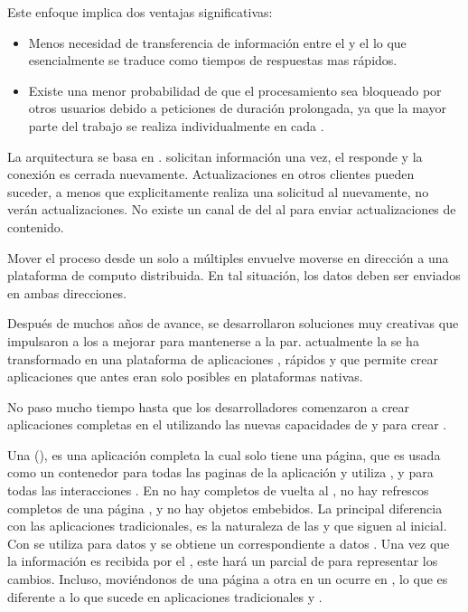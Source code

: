 Este enfoque \clientcentric implica dos ventajas significativas:
\begin{itemize}
	\item Menos necesidad de transferencia de información entre el \server y el \client lo que esencialmente se traduce como tiempos de respuestas mas rápidos.
	\item Existe una menor probabilidad de que el procesamiento sea bloqueado por otros usuarios debido a peticiones de duración prolongada, ya que la mayor parte del trabajo se realiza individualmente en cada \client.
\end{itemize}

La arquitectura \clientserver se basa en \statelessconnections. \clients solicitan información una vez, el \server responde y la conexión es cerrada nuevamente. Actualizaciones en otros clientes pueden suceder, a menos que explicitamente realiza una solicitud al \server nuevamente, no verán actualizaciones. No existe un canal de \feedback del \server al \client para enviar actualizaciones de contenido.

Mover el proceso desde un solo \server a múltiples \clients envuelve moverse en dirección a una plataforma de computo distribuida. En tal situación, los datos deben ser enviados en ambas direcciones.

Después de muchos años de avance, se desarrollaron soluciones muy creativas que impulsaron a los \browsers a mejorar para mantenerse a la par. 
actualmente la \web se ha transformado en una plataforma de aplicaciones \fullyfeatured, \runtimes \javascript rápidos y \standard \htmlfive que permite crear aplicaciones que antes eran solo posibles en plataformas nativas.

No paso mucho tiempo hasta que los desarrolladores comenzaron a crear aplicaciones completas en el \browser utilizando las nuevas capacidades de \javascript y  para crear \singlePageApp.

Una \singlePageApp (\spa), es una aplicación \web completa la cual solo tiene una página, que es usada como un contenedor para todas las paginas \web de la aplicación y utiliza \javascript, \htmlfive y \css para todas las interacciones \frontend. En \spas no hay \posts completos de vuelta al \server, no hay refrescos completos de una página \web, y no hay objetos embebidos. La principal diferencia con las aplicaciones \web tradicionales, es la naturaleza de las \requests y \responses que siguen al \request \http inicial. Con \spa se utiliza \ajax para \request datos y se obtiene un \response correspondiente a datos \json. Una vez que la información es recibida por el \client, este hará un \render parcial de \html para representar los cambios. Incluso, moviéndonos de una página a otra en un \spa ocurre en \clientside, lo que es diferente a lo que sucede en aplicaciones tradicionales y \ria.


